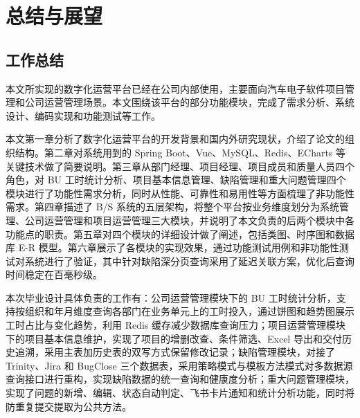 \chapter{总结与展望}

\section{工作总结}

本文所实现的数字化运营平台已经在公司内部使用，主要面向汽车电子软件项目管理和公司运营管理场景。本文围绕该平台的部分功能模块，完成了需求分析、系统设计、编码实现和功能测试等工作。

本文第一章分析了数字化运营平台的开发背景和国内外研究现状，介绍了论文的组织结构。第二章对系统用到的 Spring Boot、Vue、MySQL、Redis、ECharts 等关键技术做了简要说明。第三章从部门经理、项目经理、项目成员和质量人员四个角色，对 BU 工时统计分析、项目基本信息管理、缺陷管理和重大问题管理四个模块进行了功能性需求分析，同时从性能、可靠性和易用性等方面梳理了非功能性需求。第四章描述了 B/S 系统的五层架构，将整个平台按业务维度划分为系统管理、公司运营管理和项目运营管理三大模块，并说明了本文负责的后两个模块中各功能点的职责。第五章对四个模块的详细设计做了阐述，包括类图、时序图和数据库 E-R 模型。第六章展示了各模块的实现效果，通过功能测试用例和非功能性测试对系统进行了验证，其中针对缺陷深分页查询采用了延迟关联方案，优化后查询时间稳定在百毫秒级。

本次毕业设计具体负责的工作有：公司运营管理模块下的 BU 工时统计分析，支持按组织和年月维度查询各部门在业务单元上的工时投入，通过饼图和趋势图展示工时占比与变化趋势，利用 Redis 缓存减少数据库查询压力；项目运营管理模块下的项目基本信息维护，实现了项目的增删改查、条件筛选、Excel 导出和交付历史追溯，采用主表加历史表的双写方式保留修改记录；缺陷管理模块，对接了 Trinity、Jira 和 BugClose 三个数据表，采用策略模式与模板方法模式对多数据源查询接口进行重构，实现缺陷数据的统一查询和健康度分析；重大问题管理模块，实现了问题的新增、编辑、状态自动判定、飞书卡片通知和统计分析功能，同时将防重复提交提取为公共方法。

